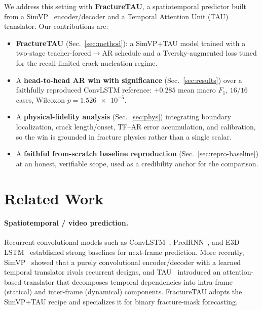 \documentclass[11pt]{article}
\begin{document}
We address this setting with \textbf{FractureTAU}, a spatiotemporal predictor
built from a SimVP~\citep{gao2022simvp} encoder/decoder and a Temporal Attention
Unit (TAU)~\citep{tan2023tau} translator. Our contributions are:
\begin{itemize}
  \item \textbf{FractureTAU} (Sec.~\ref{sec:method}): a SimVP+TAU model trained
        with a two-stage teacher-forced$\rightarrow$AR schedule and a
        Tversky-augmented loss tuned for the recall-limited crack-nucleation
        regime.
  \item A \textbf{head-to-head AR win with significance} (Sec.~\ref{sec:results})
        over a faithfully reproduced ConvLSTM reference: $+0.285$ mean macro
        $F_1$, $16/16$ cases, Wilcoxon $p{=}\num{1.526e-5}$.
  \item A \textbf{physical-fidelity analysis} (Sec.~\ref{sec:phys}) integrating
        boundary localization, crack length/onset, TF--AR error accumulation,
        and calibration, so the win is grounded in fracture physics rather than
        a single scalar.
  \item A \textbf{faithful from-scratch baseline reproduction}
        (Sec.~\ref{sec:repro-baseline}) at an honest, verifiable scope, used as a
        credibility anchor for the comparison.
\end{itemize}

\section{Related Work}
\label{sec:related}

\paragraph{Spatiotemporal / video prediction.}
Recurrent convolutional models such as ConvLSTM~\citep{shi2015convlstm},
PredRNN~\citep{wang2017predrnn}, and E3D-LSTM~\citep{wang2019e3dlstm} established
strong baselines for next-frame prediction. More recently, SimVP~\citep{gao2022simvp}
showed that a purely convolutional encoder/decoder with a learned temporal
translator rivals recurrent designs, and TAU~\citep{tan2023tau} introduced an
attention-based translator that decomposes temporal dependencies into intra-frame
(statical) and inter-frame (dynamical) components. FractureTAU adopts the
SimVP+TAU recipe and specializes it for binary fracture-mask forecasting.
\end{document}
